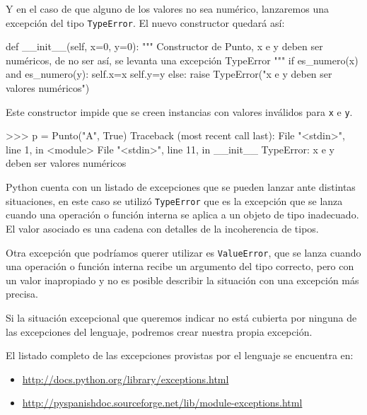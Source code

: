 Y en el caso de que alguno de los valores no sea numérico, lanzaremos una
excepción del tipo \lstinline!TypeError!.  El nuevo constructor quedará
así:

\begin{codigo-python-sn}
    def __init__(self, x=0, y=0):
        """ Constructor de Punto, x e y deben ser numéricos,
            de no ser así, se levanta una excepción TypeError """
        if es_numero(x) and es_numero(y):
            self.x=x
            self.y=y
        else:
            raise TypeError("x e y deben ser valores numéricos")
\end{codigo-python-sn}

Este constructor impide que se creen instancias con valores inválidos para
\lstinline!x! e \lstinline!y!.

\begin{codigo-python-sn}
>>> p = Punto("A", True)
Traceback (most recent call last):
  File "<stdin>", line 1, in <module>
  File "<stdin>", line 11, in __init__
TypeError: x e y deben ser valores numéricos
\end{codigo-python-sn}

\begin{sabias_que}
Python cuenta con un listado de excepciones que se pueden lanzar ante
distintas situaciones, en este caso se utilizó \lstinline!TypeError! que es
la excepción que se lanza cuando una operación o función interna se aplica
a un objeto de tipo inadecuado. El valor asociado es una cadena con
detalles de la incoherencia de tipos.

Otra excepción que podríamos querer utilizar es \lstinline!ValueError!, que
se lanza cuando una operación o función interna recibe un argumento del
tipo correcto, pero con un valor inapropiado y no es posible describir la
situación con una excepción más precisa.

Si la situación excepcional que queremos indicar no está cubierta por
ninguna de las excepciones del lenguaje, podremos crear nuestra propia
excepción.

El listado completo de las excepciones provistas por el lenguaje se
encuentra en:
\begin{itemize}
\item \url{http://docs.python.org/library/exceptions.html}
\item \url{http://pyspanishdoc.sourceforge.net/lib/module-exceptions.html}
\end{itemize}
\end{sabias_que}

